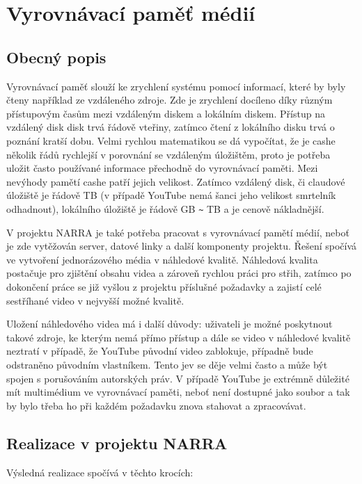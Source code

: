 \section{Vyrovnávací paměť médií}
\subsection{Obecný popis}
\par Vyrovnávací paměť\cite{sap} slouží ke zrychlení systému pomocí  informací, které by byly čteny například ze vzdáleného zdroje. Zde je zrychlení docíleno díky různým přístupovým časům mezi vzdáleným diskem a lokálním diskem. Přístup na vzdálený disk disk trvá řádově vteřiny, zatímco čtení z lokálního disku trvá o poznání kratší dobu. Velmi rychlou matematikou se dá vypočítat, že je cashe několik řádů rychlejší v porovnání se vzdáleným úložištěm, proto je potřeba uložit často používané informace přechodně do vyrovnávací paměti. Mezi nevýhody pamětí cashe patří jejich velikost. Zatímco vzdálený disk, či claudové úložiště je řádově TB (v případě YouTube nemá šanci jeho velikost smrtelník odhadnout), lokálního úložiště je řádově GB \verb|~| TB a je cenově nákladnější.
\par V projektu NARRA je také potřeba pracovat s vyrovnávací pamětí médií, neboť je zde vytěžován server, datové linky a další komponenty projektu. Řešení spočívá ve vytvoření jednorázového média v náhledové kvalitě. Náhledová kvalita postačuje pro zjištění obsahu videa a zároveň rychlou práci pro střih, zatímco po dokončení práce se již vyšlou z projektu příslušné požadavky a zajistí celé sestříhané video v nejvyšší možné kvalitě.
\par Uložení náhledového videa má i další důvody: uživateli je možné poskytnout takové zdroje, ke kterým nemá přímo přístup a dále se video v náhledové kvalitě neztratí v případě, že YouTube původní video zablokuje, případně bude odstraněno původním vlastníkem. Tento jev se děje velmi často a může být spojen s porušováním autorských práv. V případě YouTube je extrémně důležité mít multimédium ve vyrovnávací paměti, neboť není dostupné jako soubor a tak by bylo třeba ho při každém požadavku znova stahovat a zpracovávat.

\subsection{Realizace v projektu NARRA}
\par Výsledná realizace spočívá v těchto krocích:


